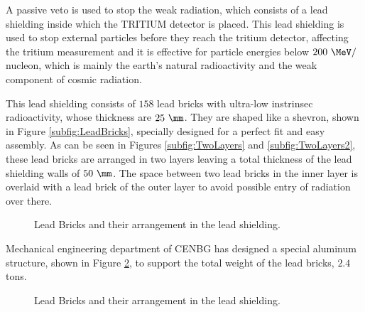 A passive veto is used to stop the weak radiation, which consists of a lead shielding inside which the TRITIUM detector is placed. This lead shielding is used to stop external particles before they reach the tritium detector, affecting the tritium measurement and it is effective for particle energies below $200~\MeV/$nucleon, which is mainly the earth's natural radioactivity and the weak component of cosmic radiation.

This lead shielding consists of $158$ lead bricks with ultra-low instrinsec radioactivity, whose thickness are $25~\mm$. They are shaped like a shevron, shown in Figure \ref{subfig:LeadBricks}, specially designed for a perfect fit and easy assembly. As can be seen in Figures \ref{subfig:TwoLayers} and \ref{subfig:TwoLayers2}, these lead bricks are arranged in two layers leaving a total thickness of the lead shielding walls of $50~\mm$. The space between two lead bricks in the inner layer is overlaid with a lead brick of the outer layer to avoid possible entry of radiation over there.

\begin{figure}[htbp]
 \centering
 \caption{Lead Bricks and their arrangement in the lead shielding.}
 \label{fig:LeadBricksAndArrangement}
\end{figure}

Mechanical engineering department of CENBG has designed a special aluminum structure, shown in Figure \ref{fig:AluminiumStructure}, to support the total weight of the lead bricks, $2.4$ tons.

\begin{figure}[htbp]
 \centering
    \caption{Lead Bricks and their arrangement in the lead shielding.}
 \label{fig:AluminiumStructure}
\end{figure}

